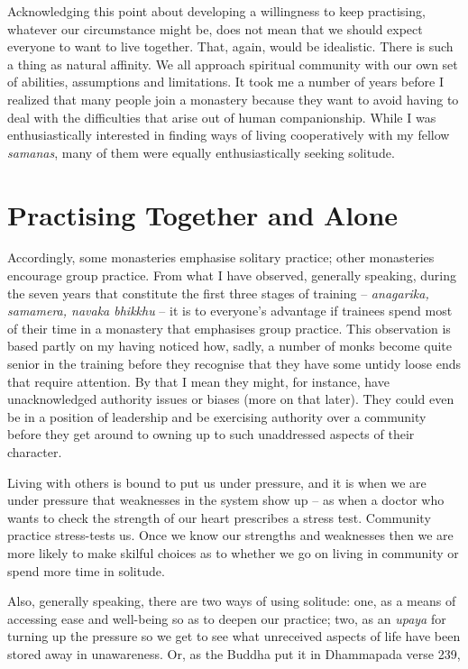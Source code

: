 Acknowledging this point about developing a willingness to keep
practising, whatever our circumstance might be, does not mean that we
should expect everyone to want to live together. That, again, would be
idealistic. There is such a thing as natural affinity. We all approach
spiritual community with our own set of abilities, assumptions and
limitations. It took me a number of years before I realized that many
people join a monastery because they want to avoid having to deal with
the difficulties that arise out of human companionship. While I was
enthusiastically interested in finding ways of living cooperatively with
my fellow \emph{samanas}, many of them were equally enthusiastically
seeking solitude.

\section{Practising Together and Alone}

Accordingly, some monasteries emphasise solitary practice; other
monasteries encourage group practice. From what I have observed,
generally speaking, during the seven years that constitute the first
three stages of training -- \emph{anagarika, samamera, navaka bhikkhu} --
it is to everyone's advantage if trainees spend most of their time in a
monastery that emphasises group practice. This observation is based
partly on my having noticed how, sadly, a number of monks become quite
senior in the training before they recognise that they have some untidy
loose ends that require attention. By that I mean they might, for
instance, have unacknowledged authority issues or biases (more on that
later). They could even be in a position of leadership and be exercising
authority over a community before they get around to owning up to such
unaddressed aspects of their character.

Living with others is bound to put us under pressure, and it is when we
are under pressure that weaknesses in the system show up -- as when a
doctor who wants to check the strength of our heart prescribes a stress
test. Community practice stress-tests us. Once we know our strengths and
weaknesses then we are more likely to make skilful choices as to whether
we go on living in community or spend more time in solitude.

Also, generally speaking, there are two ways of using solitude: one, as
a means of accessing ease and well-being so as to deepen our practice;
two, as an \emph{upaya} for turning up the pressure so we get to see
what unreceived aspects of life have been stored away in unawareness.
Or, as the Buddha put it in Dhammapada verse 239,

